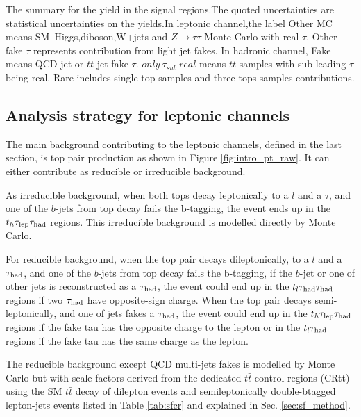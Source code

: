 \begin{table}
\caption{The summary for the yield in the signal regions.The quoted uncertainties are statistical uncertainties on the yields.In leptonic channel,the label Other MC means SM~Higgs,diboson,W+jets and $Z\to\tau\tau$  Monte Carlo with real $\tau$. Other fake $\tau$ represents contribution from light jet fakes. In hadronic channel, Fake means QCD jet or $t\bar{t}$ jet fake $\tau$. $only~\tau_{sub}~real$ means $t\bar{t}$ samples with sub leading $\tau$ being real. Rare includes single top samples and three tops samples contributions.}
\label{tab:yield_SR}
\small


\end{table}

\subsection{Analysis strategy for leptonic channels}

The main background contributing to the leptonic channels, defined in the last section, is top pair production as shown in Figure \ref{fig:intro_pt_raw}. It can either contribute as reducible or irreducible background.



As irreducible background, when both tops decay leptonically to a $l$ and a $\tau$, and one of the $b$-jets from top decay fails the b-tagging, the event ends up in the $t_h\tau_\text{lep}{}\tau_\text{had}$ regions. This irreducible background is modelled directly by Monte Carlo.

For reducible background, when the top pair decays dileptonically, to a $l$ and a $\tau_\text{had}$, and one of the $b$-jets from top decay fails the b-tagging, if the $b$-jet or one of other jets is reconstructed as a $\tau_\text{had}$, the event could end up in the $t_l\tau_\text{had}{}\tau_\text{had}$ regions if two $\tau_\text{had}$ have opposite-sign charge. When the top pair decays semi-leptonically, and one of jets fakes a $\tau_\text{had}$, the event could end up in the  $t_h\tau_\text{lep}{}\tau_\text{had}$ regions if the fake tau has the opposite charge to the lepton or in the $t_l\tau_\text{had}$ regions if the fake tau has the same charge as the lepton. 

The reducible background except QCD multi-jets fakes is modelled by Monte Carlo but with scale factors derived from the dedicated $t\bar{t}$ control regions (CRtt) using the SM
$t\bar{t}$ decay of dilepton events and semileptonically double-btagged lepton-jets events listed
in Table \ref{tab:sfcr} and explained in Sec. \ref{sec:sf_method}.

